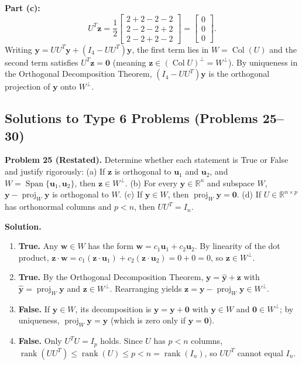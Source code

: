 \documentclass[11pt, letterpaper]{article}
\theoremstyle{definition}
\theoremstyle{remark}
\newcommand{\R}{\mathbb{R}}
\begin{document}
\textbf{Part (c):}
\[
U^T \mathbf{z} = \frac{1}{2}\begin{bmatrix} 2 + 2 - 2 - 2 \\ 2 - 2 - 2 + 2 \\ 2 - 2 + 2 - 2 \end{bmatrix} = \begin{bmatrix} 0 \\ 0 \\ 0 \end{bmatrix}.
\]
Writing $\mathbf{y} = UU^T\mathbf{y} + (I_4 - UU^T)\mathbf{y}$, the first term lies in $W = \operatorname{Col}(U)$ and the second term satisfies $U^T\mathbf{z} = \mathbf{0}$ (meaning $\mathbf{z} \in (\operatorname{Col} U)^\perp = W^\perp$). By uniqueness in the Orthogonal Decomposition Theorem, $(I_4 - UU^T)\mathbf{y}$ is the orthogonal projection of $\mathbf{y}$ onto $W^\perp$.

\subsection{Solutions to Type 6 Problems (Problems 25--30)}

\textbf{Problem 25 (Restated).} Determine whether each statement is True or False and justify rigorously: (a) If $\mathbf{z}$ is orthogonal to $\mathbf{u}_1$ and $\mathbf{u}_2$, and $W = \operatorname{Span}\{\mathbf{u}_1, \mathbf{u}_2\}$, then $\mathbf{z} \in W^\perp$. (b) For every $\mathbf{y} \in \R^n$ and subspace $W$, $\mathbf{y} - \operatorname{proj}_W \mathbf{y}$ is orthogonal to $W$. (c) If $\mathbf{y} \in W$, then $\operatorname{proj}_W \mathbf{y} = \mathbf{0}$. (d) If $U \in \R^{n \times p}$ has orthonormal columns and $p < n$, then $UU^T = I_n$.

\textbf{Solution.}
\begin{enumerate}[label=(\alph*)]
    \item \textbf{True.} Any $\mathbf{w} \in W$ has the form $\mathbf{w} = c_1\mathbf{u}_1 + c_2\mathbf{u}_2$. By linearity of the dot product, $\mathbf{z}\cdot\mathbf{w} = c_1(\mathbf{z}\cdot\mathbf{u}_1) + c_2(\mathbf{z}\cdot\mathbf{u}_2) = 0 + 0 = 0$, so $\mathbf{z} \in W^\perp$.
    \item \textbf{True.} By the Orthogonal Decomposition Theorem, $\mathbf{y} = \hat{\mathbf{y}} + \mathbf{z}$ with $\hat{\mathbf{y}} = \operatorname{proj}_W \mathbf{y}$ and $\mathbf{z} \in W^\perp$. Rearranging yields $\mathbf{z} = \mathbf{y} - \operatorname{proj}_W \mathbf{y} \in W^\perp$.
    \item \textbf{False.} If $\mathbf{y} \in W$, its decomposition is $\mathbf{y} = \mathbf{y} + \mathbf{0}$ with $\mathbf{y} \in W$ and $\mathbf{0} \in W^\perp$; by uniqueness, $\operatorname{proj}_W \mathbf{y} = \mathbf{y}$ (which is zero only if $\mathbf{y} = \mathbf{0}$).
    \item \textbf{False.} Only $U^T U = I_p$ holds. Since $U$ has $p < n$ columns, $\operatorname{rank}(UU^T) \le \operatorname{rank}(U) \le p < n = \operatorname{rank}(I_n)$, so $UU^T$ cannot equal $I_n$.
\end{enumerate}
\end{document}

